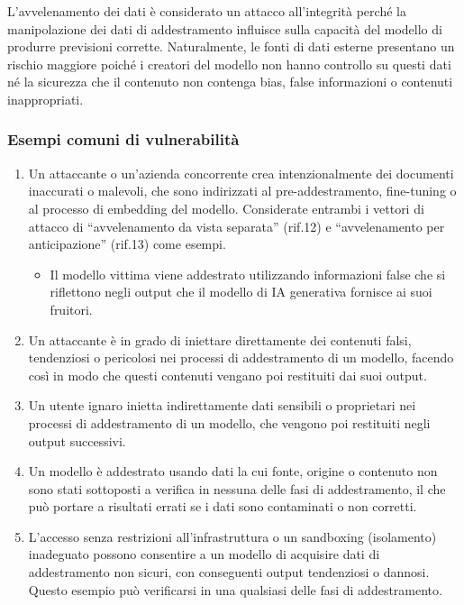 \documentclass[
]{article}
\providecommand{\tightlist}{%
  \setlength{\itemsep}{0pt}\setlength{\parskip}{0pt}}
\begin{document}
L'avvelenamento dei dati è considerato un attacco all'integrità perché
la manipolazione dei dati di addestramento influisce sulla capacità del
modello di produrre previsioni corrette. Naturalmente, le fonti di dati
esterne presentano un rischio maggiore poiché i creatori del modello non
hanno controllo su questi dati né la sicurezza che il contenuto non
contenga bias, false informazioni o contenuti inappropriati.

\subsubsection{Esempi comuni di
vulnerabilità}\label{esempi-comuni-di-vulnerabilituxe0}

\begin{enumerate}
\def\labelenumi{\arabic{enumi}.}
\tightlist
\item
  Un attaccante o un'azienda concorrente crea intenzionalmente dei
  documenti inaccurati o malevoli, che sono indirizzati al
  pre-addestramento, fine-tuning o al processo di embedding del modello.
  Considerate entrambi i vettori di attacco di ``avvelenamento da vista
  separata'' (rif.12) e ``avvelenamento per anticipazione'' (rif.13)
  come esempi.

  \begin{itemize}
  \tightlist
  \item
    Il modello vittima viene addestrato utilizzando informazioni false
    che si riflettono negli output che il modello di IA generativa
    fornisce ai suoi fruitori.
  \end{itemize}
\item
  Un attaccante è in grado di iniettare direttamente dei contenuti
  falsi, tendenziosi o pericolosi nei processi di addestramento di un
  modello, facendo così in modo che questi contenuti vengano poi
  restituiti dai suoi output.
\item
  Un utente ignaro inietta indirettamente dati sensibili o proprietari
  nei processi di addestramento di un modello, che vengono poi
  restituiti negli output successivi.
\item
  Un modello è addestrato usando dati la cui fonte, origine o contenuto
  non sono stati sottoposti a verifica in nessuna delle fasi di
  addestramento, il che può portare a risultati errati se i dati sono
  contaminati o non corretti.
\item
  L'accesso senza restrizioni all'infrastruttura o un sandboxing
  (isolamento) inadeguato possono consentire a un modello di acquisire
  dati di addestramento non sicuri, con conseguenti output tendenziosi o
  dannosi. Questo esempio può verificarsi in una qualsiasi delle fasi di
  addestramento.


\end{enumerate}
\end{document}
